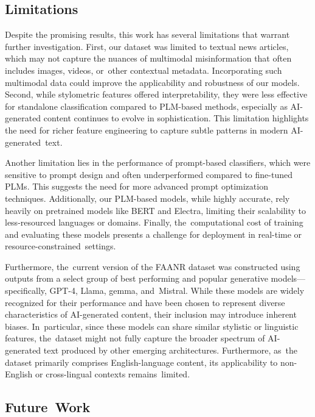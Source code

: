 \documentclass[electronics,article,accept,pdftex,moreauthors,electronics]{Definitions/mdpi}
\begin{document}
\subsection{Limitations}
\label{subsec:limitations}

Despite the promising results, this work has several limitations that warrant further investigation. First, our dataset was limited to textual news articles, which may not capture the nuances of multimodal misinformation that often includes images, videos, or~other contextual metadata. Incorporating such multimodal data could improve the applicability and robustness of our models. Second, while stylometric features offered interpretability, they were less effective for standalone classification compared to PLM-based methods, especially as AI-generated content continues to evolve in sophistication. This limitation highlights the need for richer feature engineering to capture subtle patterns in modern AI-generated~text.

Another limitation lies in the performance of prompt-based classifiers, which were sensitive to prompt design and often underperformed compared to fine-tuned PLMs. This suggests the need for more advanced prompt optimization techniques. Additionally, our PLM-based models, while highly accurate, rely heavily on pretrained models like BERT and Electra, limiting their scalability to less-resourced languages or domains. Finally, the~computational cost of training and evaluating these models presents a challenge for deployment in real-time or resource-constrained~settings.

Furthermore, the~current version of the FAANR dataset was constructed using outputs from a select group of best performing and popular generative models---specifically, GPT-4, Llama, gemma, and~Mistral. While these models are widely recognized for their performance and have been chosen to represent diverse characteristics of AI-generated content, their inclusion may introduce inherent biases. In~particular, since these models can share similar stylistic or linguistic features, the~dataset might not fully capture the broader spectrum of AI-generated text produced by other emerging architectures. Furthermore, as~the dataset primarily comprises English-language content, its applicability to non-English or cross-lingual contexts remains~limited.


\subsection{Future~Work}
\label{subsec:future_work}
\end{document}
